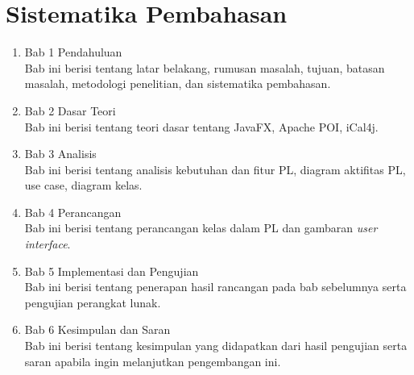 \section{Sistematika Pembahasan}
\label{sec:sispem}
\begin{enumerate}
	\item Bab 1 Pendahuluan\\
	Bab ini berisi tentang latar belakang, rumusan masalah, tujuan, batasan masalah, metodologi penelitian, dan sistematika pembahasan.
	\item Bab 2 Dasar Teori\\
	Bab ini berisi tentang teori dasar tentang JavaFX, Apache POI, iCal4j.
	\item Bab 3 Analisis\\
	Bab ini berisi tentang analisis kebutuhan dan fitur PL, diagram aktifitas PL, use case, diagram kelas.
	\item Bab 4 Perancangan\\
	Bab ini berisi tentang perancangan kelas dalam PL dan gambaran \textit{user interface}.
	\item Bab 5 Implementasi dan Pengujian\\
	Bab ini berisi tentang penerapan hasil rancangan pada bab sebelumnya serta pengujian perangkat lunak.
	\item Bab 6 Kesimpulan dan Saran\\
	Bab ini berisi tentang kesimpulan yang didapatkan dari hasil pengujian serta saran apabila ingin melanjutkan pengembangan ini.
\end{enumerate}